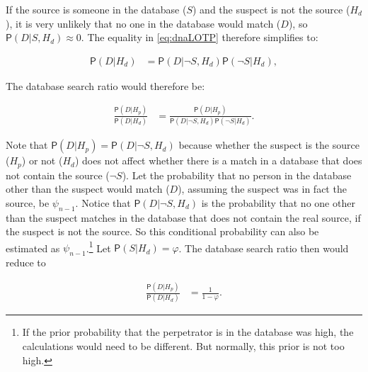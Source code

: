 \documentclass[10pt,dvipsnames,enabledeprecatedfontcommands]{scrartcl}
\newcommand{\pr}[1]{\mathsf{P}(#1)}
\begin{document}
If the source is someone in the database (\(S\)) and the suspect is not
the source (\(H_d\)), it is very unlikely that no one in the database
would match (\(D\)), so \(\pr{D\vert S, H_d}\approx 0\). The equality in
\eqref{eq:dnaLOTP} therefore simplifies to: \vspace{-4mm}

\begin{align*}
\pr{D\vert H_d} & =  \pr{D\vert \neg S, H_d} \pr{\neg S \vert H_d}, 
\end{align*}

\noindent The database search ratio would therefore be:

\begin{align*}
\frac{\pr{D\vert H_p}}{\pr{D\vert H_d}} & = \frac{\pr{D\vert H_p}}{\pr{D\vert \neg S, H_d} \pr{\neg S \vert H_d}}.
\end{align*}

\noindent Note that \(\pr{D\vert H_p}=\pr{D\vert \neg S, H_d}\) because
whether the suspect is the source (\(H_p\)) or not (\(H_d\)) does not
affect whether there is a match in a database that does not contain the
source (\(\neg S\)). Let the probability that no person in the database
other than the suspect would match (\(D\)), assuming the suspect was in
fact the source, be \(\psi_{n-1}\). Notice that
\(\pr{D\vert \neg S, H_d}\) is the probability that no one other than
the suspect matches in the database that does not contain the real
source, if the suspect is not the source. So this conditional
probability can also be estimated as
\(\psi_{n-1}\).\footnote{If the prior probability that the perpetrator is in the database was high, the calculations would need to be different. But normally, this prior is not too high.}
Let \(\pr{S | H_d}=\varphi\). The database search ratio then would
reduce to \vspace{-2mm}

\begin{align*}
\frac{\pr{D\vert H_p}}{\pr{D\vert H_d}} & = \frac{1}{1-\varphi}.
\end{align*}
\end{document}
